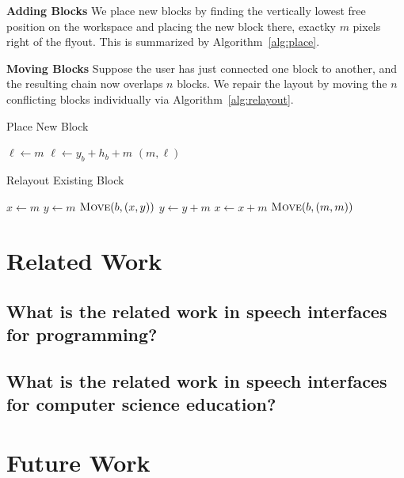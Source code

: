 \documentclass[]{article}
\begin{document}
\textbf{Adding Blocks} We place new blocks by finding the vertically lowest free
position on the workspace and placing the new block there, exactky $m$ pixels right of
the flyout. This is summarized by Algorithm~\ref{alg:place}.

\textbf{Moving Blocks} Suppose the user has just connected one block to another, and the
resulting chain now overlaps $n$ blocks. We repair the layout by moving the $n$ conflicting
blocks individually via Algorithm~\ref{alg:relayout}. 

\begin{algorithm}[H]
\caption{Place New Block}\label{alg:place}
\begin{algorithmic}
\State $\ell \gets m$ 
		\State $\ell \gets y_b + h_b + m$
	\EndIf
\EndFor
\State \Return $(m, \ell)$
\EndProcedure
\end{algorithmic}
\end{algorithm}

\begin{algorithm}[H]
\caption{Relayout Existing Block}\label{alg:relayout}
\begin{algorithmic}
\State $x \gets m$
	\State $y \gets m$
				\State $\textsc{Move}(b, (x,y))$
		\EndIf
		\State $y \gets y + m$
	\EndWhile
	\State $x \gets x + m$
\EndWhile
\State $\textsc{Move}(b, (m,m))$
\EndProcedure
\end{algorithmic}
\end{algorithm}

\section{Related Work}

\subsection{What is the related work in speech interfaces for programming?}

\subsection{What is the related work in speech interfaces for computer science education?}


\section{Future Work}
\end{document}
